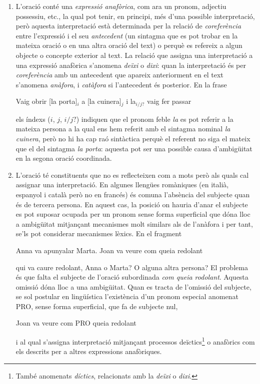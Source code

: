 \begin{enumerate}
\item L'oració conté una \emph{expressió anafòrica}, com ara un
  pronom, adjectiu possessiu, etc., la qual pot tenir, en principi,
  més d'una possible interpretació, però aquesta interpretació està
  determinada per la relació de \emph{coreferència} entre l'expressió
  i el seu \emph{antecedent} (un sintagma que es pot trobar en la
  mateixa oració o en una altra oració del text) o perquè es refereix
  a algun objecte o concepte exterior al text. La relació que assigna
  una interpretació a una expressió anafòrica s'anomena \emph{deïxi} o
  \emph{dixi}: quan la interpretació és per \emph{coreferència} amb un
  antecedent que apareix anteriorment en el text s'anomena
  \emph{anàfora}\label{pg:anafora}, i \emph{catàfora} si l'antecedent
  és posterior.  En la frase
\begin{exemple}
  Vaig obrir [la porta]$_i$ a [la cuinera]$_j$ i la$_{i/j?}$ vaig fer
  passar
\end{exemple}
els índexs ($i$, $j$, $i/j?$) indiquen que el pronom feble \emph{la}
es pot referir a la mateixa persona a la qual ens hem referit amb el
sintagma nominal \emph{la cuinera}, però no hi ha cap raó sintàctica
perquè el referent no siga el mateix que el del sintagma \emph{la
  porta}: aquesta pot ser una possible causa d'ambigüitat en la segona
oració coordinada.

\item L'oració té constituents que no es reflecteixen com a mots però
  als quals cal assignar una interpretació. En algunes llengües
  romàniques (en italià, espanyol i català però no en francés) és
  comuna l'absència del subjecte quan és de tercera persona. En aquest
  cas, la posició on hauria d'anar el subjecte es pot suposar ocupada
  per un pronom sense forma superficial que dóna lloc a ambigüitat
  mitjançant mecanismes molt similars als de l'anàfora i per tant,
  se'ls pot considerar mecanismes lèxics.  En el fragment
  \begin{exemple}
    Anna va apunyalar Marta. Joan va veure com queia redolant
  \end{exemple}
  qui va caure redolant, Anna o Marta?  O alguna altra persona?  El
  problema és que falta el subjecte de l'oració subordinada \emph{com
    queia rodolant}. Aquesta omissió dóna lloc a una ambigüitat. Quan
  es tracta de l'omissió del subjecte, se sol postular en lingüística
  l'existència d'un pronom especial anomenat PRO, sense forma
  superficial, que fa de subjecte nul,
  \begin{exemple}
    Joan va veure com PRO queia redolant
  \end{exemple}
  i al qual s'assigna interpretació mitjançant processos
  deïctics\footnote{També anomenats \emph{díctics}, relacionats amb la
    \emph{deïxi} o \emph{dixi}.} o anafòrics com els descrits per a
  altres expressions anafòriques.
  

\end{enumerate}
